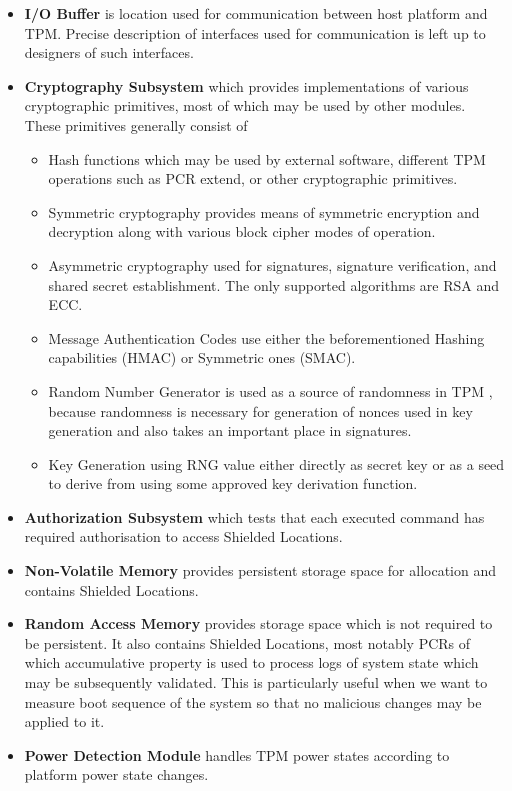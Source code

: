 \begin{itemize}

\item \textbf{I/O Buffer} is location used for communication between host platform and TPM. Precise description of interfaces used for communication is left up to designers of such interfaces.

\item \textbf{Cryptography Subsystem} which provides implementations of various cryptographic primitives, most of which may be used by other modules. These primitives generally consist of 
\begin{itemize}
    \item Hash functions which may be used by external software, different TPM operations such as PCR extend, or other cryptographic primitives. 
    \item Symmetric cryptography provides means of symmetric encryption and decryption along with various block cipher modes of operation.
    \item Asymmetric cryptography used for signatures, signature verification, and shared secret establishment. The only supported algorithms are RSA and ECC.
    \item Message Authentication Codes use either the beforementioned Hashing capabilities (HMAC) or Symmetric ones (SMAC).
    \item Random Number Generator is used as a source of randomness in TPM , because randomness is necessary for generation of nonces used in key generation and also takes an important place in signatures.
    \item Key Generation using RNG value either directly as secret key or as a seed to derive from using some approved key derivation function.
\end{itemize}

\item \textbf{Authorization Subsystem} which tests that each executed command has required authorisation to access Shielded Locations. 

\item \textbf{Non-Volatile Memory} provides persistent storage space for allocation and contains Shielded Locations.

\item \textbf{Random Access Memory} provides storage space which is not required to be persistent. It also contains Shielded Locations, most notably PCRs of which accumulative property is used to process logs of system state which may be subsequently validated. This is particularly useful when we want to measure boot sequence of the system so that no malicious changes may be applied to it.

\item \textbf{Power Detection Module} handles TPM power states according to platform power state changes.
\end{itemize}

